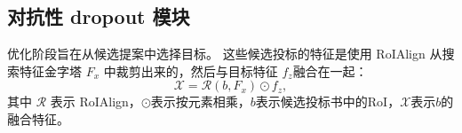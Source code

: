 \subsection{对抗性 dropout 模块}
\label{sec:stage2}
优化阶段旨在从候选提案中选择目标。
这些候选投标的特征是使用 RoIAlign \cite{he2017mask} 从搜索特征金字塔 $F_{x}$ 中裁剪出来的，然后与目标特征 $f_{z}$融合在一起：
\begin{equation}
    \mathcal{X} = \mathcal{R}(b, F_{x}) \odot f_{z},
\end{equation}
其中 $\mathcal{R}$ 表示 RoIAlign，$\odot$表示按元素相乘，$b$表示候选投标书中的RoI，$\mathcal{X}$表示$b$的融合特征。

